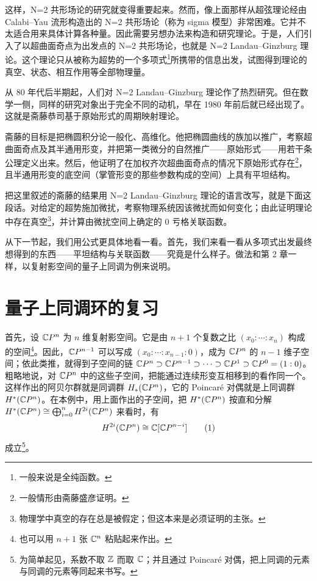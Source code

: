 这样，N=2 共形场论的研究就变得重要起来。然而，像上面那样从超弦理论经由 Calabi--Yau 流形构造出的 N=2 共形场论（称为 sigma 模型）非常困难。它并不太适合用来具体计算各种量。因此需要另想办法来构造和研究理论。于是，人们引入了以超曲面奇点为出发点的 N=2 共形场论，也就是 N=2 Landau--Ginzburg 理论。这个理论只从被称为超势的一个多项式\footnote{一般来说是全纯函数。}所携带的信息出发，试图得到理论的真空、状态、相互作用等全部物理量。

从 80 年代后半期起，人们对 N=2 Landau--Ginzburg 理论作了热烈研究。但在数学一侧，同样的研究对象出于完全不同的动机，早在 1980 年前后就已经出现了。这就是斋藤恭司基于原始形式的周期映射理论。

斋藤的目标是把椭圆积分论一般化、高维化。他把椭圆曲线的族加以推广，考察超曲面奇点及其半通用形变，并把第一类微分的自然推广——原始形式——用若干条公理定义出来。然后，他证明了在加权齐次超曲面奇点的情况下原始形式存在\footnote{一般情形由斋藤盛彦证明。}，且半通用形变的底空间（掌管形变的那些参数构成的空间）上具有平坦结构。

把这里叙述的斋藤的结果用 N=2 Landau--Ginzburg 理论的语言改写，就是下面这段话。对给定的超势施加微扰，考察物理系统因该微扰而如何变化；由此证明理论中存在真空\footnote{物理学中真空的存在总是被假定；但这本来是必须证明的主张。}，并计算由微扰空间上确定的 0 亏格关联函数。

从下一节起，我们用公式更具体地看一看。首先，我们来看一看从多项式出发最终想得到的东西——平坦结构与关联函数——究竟是什么样子。做法和第 2 章一样，以复射影空间的量子上同调为例来说明。

\section{量子上同调环的复习}

首先，设 $\mathbb{C}P^n$ 为 $n$ 维复射影空间。它是由 $n+1$ 个复数之比 $(x_0:\cdots:x_n)$ 构成的空间\footnote{也可以用 $n+1$ 张 $\mathbb{C}^n$ 粘贴起来作出。}。因此，$\mathbb{C}P^{n-1}$ 可以写成 $(x_0:\cdots:x_{n-1}:0)$，成为 $\mathbb{C}P^n$ 的 $n-1$ 维子空间；依此类推，就得到子空间的链 $\mathbb{C}P^n\supset\mathbb{C}P^{n-1}\supset\cdots\supset\mathbb{C}P^1\supset\mathbb{C}P^0=(1:0)$。粗略地说，对 $\mathbb{C}P^n$ 中的这些子空间，把能通过连续形变互相移到的看作同一个。这样作出的阿贝尔群就是同调群 $H_*(\mathbb{C}P^n)$，它的 Poincaré 对偶就是上同调群 $H^*(\mathbb{C}P^n)$。在本例中，用上面作出的子空间，把 $H^*(\mathbb{C}P^n)$ 按直和分解 $H^*(\mathbb{C}P^n)\cong\bigoplus_{i=0}^{n}H^{2i}(\mathbb{C}P^n)$ 来看时，有
\begin{equation}
  H^{2i}(\mathbb{C}P^n)\cong \mathbb{C}[\mathbb{C}P^{n-i}]
  \tag{1}
\end{equation}
成立\footnote{为简单起见，系数不取 $\mathbb{Z}$ 而取 $\mathbb{C}$；并且通过 Poincaré 对偶，把上同调的元素与同调的元素等同起来书写。}。

